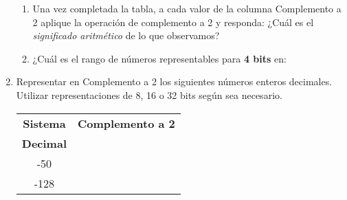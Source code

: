 \documentclass[12pt]{article}
\begin{document}
\begin{enumerate}
\begin{center}
        \end{center}

        \begin{enumerate}

            \item Una vez completada la tabla, a cada valor de la columna
                Complemento a 2 aplique la operación de complemento a 2 y
                responda: ¿Cuál es el \emph{significado aritmético} de lo que
                observamos?

            \item ¿Cuál es el rango de números representables para \textbf{4
                bits} en:


    \end{enumerate}

    \item Representar en Complemento a 2 los siguientes números enteros
        decimales. Utilizar representaciones de 8, 16 o 32 bits según sea
        necesario.

        \begin{center}

            \begin{tabular}[t]{|c|c|}

            \hline

                \textbf{Sistema} & \textbf{Complemento a 2}\\

                \textbf{Decimal} & ~ \\

            \hline

                -50 & \hspace{27em}~ \\

            \hline

                -128&\\


\end{tabular}
\end{center}
\end{enumerate}
\end{document}

